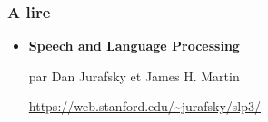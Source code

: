 \documentclass{beamer}
\begin{document}
\begin{frame}
	\frametitle{A lire}
	
	\begin{itemize}
		\item \textbf{Speech and Language Processing} 
		
		par Dan Jurafsky et James H. Martin
		
		\url{https://web.stanford.edu/~jurafsky/slp3/}
	\end{itemize}
	
\end{frame}
\end{document}
